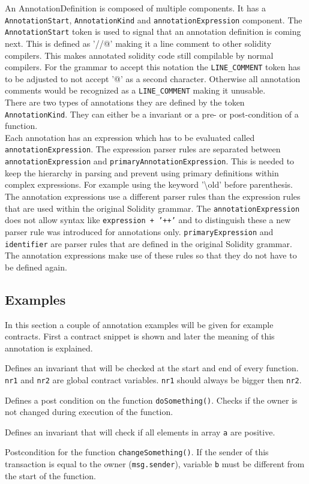 \documentclass[a4paper]{article}
\begin{document}
An AnnotationDefinition is composed of multiple components. It has a \texttt{AnnotationStart}, \texttt{AnnotationKind} and \texttt{annotationExpression} component. The \texttt{AnnotationStart} token is used to signal that an annotation definition is coming next. This is defined as '//@' making it a line comment to other solidity compilers. This makes annotated solidity code still compilable by normal compilers. For the grammar to accept this notation the \texttt{LINE\_COMMENT} token has to be adjusted to not accept '@' as a second character. Otherwise all annotation comments would be recognized as a \texttt{LINE\_COMMENT} making it unusable. \\
There are two types of annotations they are defined by the token \texttt{AnnotationKind}. They can either be a invariant or a pre- or post-condition of a function. \\
Each annotation has an expression which has to be evaluated called \texttt{annotationExpression}. The expression parser rules are separated between \texttt{annotationExpression} and \texttt{primaryAnnotationExpression}. This is needed to keep the hierarchy in parsing and prevent using primary definitions within complex expressions. For example using the keyword '\textbackslash old' before parenthesis.\\
The annotation expressions use a different parser rules than the expression rules that are used within the original Solidity grammar. The \texttt{annotationExpression} does not allow syntax like \texttt{expression + '++'} and to distinguish these a new parser rule was introduced for annotations only. \texttt{primaryExpression} and \texttt{identifier} are parser rules that are defined in the original Solidity grammar. The annotation expressions make use of these rules so that they do not have to be defined again.

\subsection{Examples}
In this section a couple of annotation examples will be given for example contracts. First a contract snippet is shown and later the meaning of this annotation is explained.

Defines an invariant that will be checked at the start and end of every function. \texttt{nr1} and \texttt{nr2} are global contract variables. \texttt{nr1} should always be bigger then \texttt{nr2}.

Defines a post condition on the function \texttt{doSomething()}. Checks if the owner is not changed during execution of the function.

Defines an invariant that will check if all elements in array \texttt{a} are positive.

Postcondition for the function \texttt{changeSomething()}. If the sender of this transaction is equal to the owner (\texttt{msg.sender}), variable \texttt{b} must be different from the start of the function. 
\end{document}
